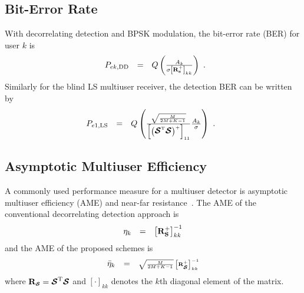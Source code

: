\documentclass[a4paper,10pt,fleqn, twocolumn]{IEEETran}
\newcommand{\bs}{{\bf s}}
\newcommand{\bS}{{\bf S}}
\newcommand{\bR}{{\bf R}}
\newcommand{\bcS}{{\mbox {\boldmath ${\cal S}$}}}
\begin{document}
\subsection{Bit-Error Rate}
With decorrelating detection and BPSK modulation, the bit-error
rate (BER) for user $k$ is
\begin{equation}
\begin{array}{rcl}
P_{ek,\rm\small DD} &=&
Q\left(\frac{A_{k}}{\sigma\left[\bR_{\bs}^{+}\right]_{kk}}\right)
\end{array}.\label{BER_DD}
\end{equation}
\noindent Similarly for the blind LS multiuser receiver, the
detection BER can be written by
\begin{equation}\hspace{-0.07in}
\begin{array}{rcl}
P_{e1,\rm\small LS} &=&
Q\left(\frac{\sqrt{\frac{M}{2M+K-1}}}{\left[\left(\bcS^{\rm
T}\bcS\right)^{+}\right]_{11}}\frac{A_k}{\sigma}\right)\ .
\end{array}\label{BER_LS}
\end{equation}
\subsection{Asymptotic Multiuser Efficiency} A commonly used performance measure for a
multiuser detector is asymptotic multiuser efficiency (AME) and
near-far resistance~\cite{Verd98}. The AME of the conventional
decorrelating detection approach is
\begin{equation}
\begin{array}{rcl}
{\eta}_k&=&\left[\bR_{\bS}^{+}\right]_{kk}^{-1}
\end{array}
\end{equation}
\noindent and the AME of the proposed schemes is
\begin{equation}
\begin{array}{rcl}
\bar{\eta}_k&=&\sqrt{\frac{M}{2M+K-1}}\left[\bR_{\tiny\bcS}^{+}\right]_{kk}^{-1}
\end{array}
\end{equation}
\noindent where $\bR_{\tiny\bcS}=\bcS^{\rm T}\bcS$ and
$\left[\cdot\right]_{kk}$ denotes the $k$th diagonal element of
the matrix.
\end{document}
